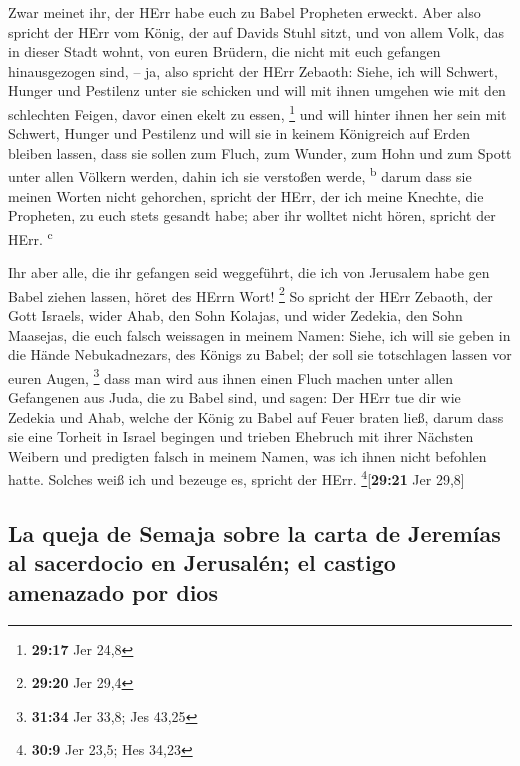  Zwar meinet ihr, der HErr habe euch zu Babel Propheten
erweckt.  Aber also spricht der HErr vom König, der auf
Davids Stuhl sitzt, und von allem Volk, das in dieser Stadt wohnt, von
euren Brüdern, die nicht mit euch gefangen hinausgezogen sind,
 -- ja, also spricht der HErr Zebaoth: Siehe, ich will
Schwert, Hunger und Pestilenz unter sie schicken und will mit ihnen
umgehen wie mit den schlechten Feigen, davor einen ekelt zu essen,
\footnote{\textbf{29:17} Jer 24,8}  und will hinter ihnen
her sein mit Schwert, Hunger und Pestilenz und will sie in keinem
Königreich auf Erden bleiben lassen, dass sie sollen zum Fluch, zum
Wunder, zum Hohn und zum Spott unter allen Völkern werden, dahin ich sie
verstoßen werde, \textsuperscript{b}  darum dass sie
meinen Worten nicht gehorchen, spricht der HErr, der ich meine Knechte,
die Propheten, zu euch stets gesandt habe; aber ihr wolltet nicht hören,
spricht der HErr. \textsuperscript{c}

 Ihr aber alle, die ihr gefangen seid weggeführt, die ich
von Jerusalem habe gen Babel ziehen lassen, höret des HErrn Wort!
\footnote{\textbf{29:20} Jer 29,4}  So spricht der HErr
Zebaoth, der Gott Israels, wider Ahab, den Sohn Kolajas, und wider
Zedekia, den Sohn Maasejas, die euch falsch weissagen in meinem Namen:
Siehe, ich will sie geben in die Hände Nebukadnezars, des Königs zu
Babel; der soll sie totschlagen lassen vor euren Augen, \footnote{\textbf{31:34}
  Jer 33,8; Jes 43,25}  dass man wird aus ihnen einen
Fluch machen unter allen Gefangenen aus Juda, die zu Babel sind, und
sagen: Der HErr tue dir wie Zedekia und Ahab, welche der König zu Babel
auf Feuer braten ließ,  darum dass sie eine Torheit in
Israel begingen und trieben Ehebruch mit ihrer Nächsten Weibern und
predigten falsch in meinem Namen, was ich ihnen nicht befohlen hatte.
Solches weiß ich und bezeuge es, spricht der HErr.
\footnote{\textbf{30:9} Jer 23,5; Hes 34,23}{[}\textbf{29:21} Jer
29,8{]}

\hypertarget{la-queja-de-semaja-sobre-la-carta-de-jeremuxedas-al-sacerdocio-en-jerusaluxe9n-el-castigo-amenazado-por-dios}{%
\subsection{La queja de Semaja sobre la carta de Jeremías al sacerdocio
en Jerusalén; el castigo amenazado por
dios}\label{la-queja-de-semaja-sobre-la-carta-de-jeremuxedas-al-sacerdocio-en-jerusaluxe9n-el-castigo-amenazado-por-dios}}

